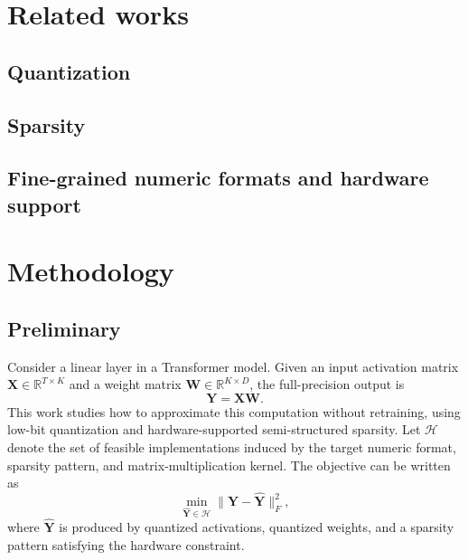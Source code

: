 \documentclass{article}
\begin{document}
\section{Related works}

\subsection{Quantization}

\subsection{Sparsity}

\subsection{Fine-grained numeric formats and hardware support}

\section{Methodology}

\subsection{Preliminary}

Consider a linear layer in a Transformer model. Given an input activation matrix
$\mathbf{X} \in \mathbb{R}^{T \times K}$ and a weight matrix
$\mathbf{W} \in \mathbb{R}^{K \times D}$, the full-precision output is
\begin{equation}
  \mathbf{Y} = \mathbf{X}\mathbf{W}.
  \label{eq:linear-layer}
\end{equation}
This work studies how to approximate this computation without retraining, using
low-bit quantization and hardware-supported semi-structured sparsity. Let
$\mathcal{H}$ denote the set of feasible implementations induced by the target
numeric format, sparsity pattern, and matrix-multiplication kernel. The objective
can be written as
\begin{equation}
  \min_{\widehat{\mathbf{Y}} \in \mathcal{H}}
  \| \mathbf{Y} - \widehat{\mathbf{Y}} \|_F^2 ,
  \label{eq:hardware-objective}
\end{equation}
where $\widehat{\mathbf{Y}}$ is produced by quantized activations, quantized
weights, and a sparsity pattern satisfying the hardware constraint.
\end{document}
